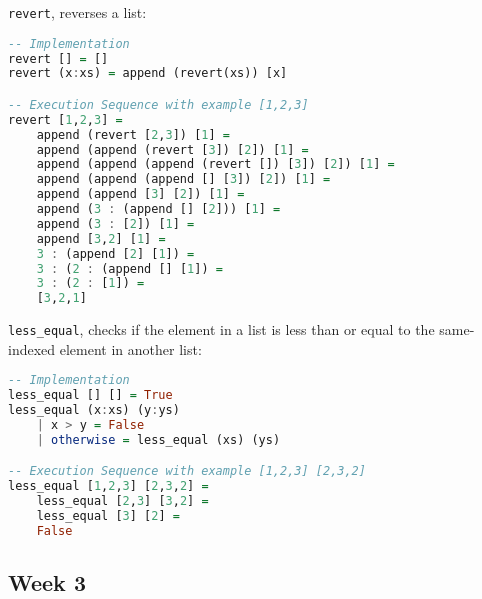 \documentclass{article}
\theoremstyle{theorem}
\theoremstyle{definition}
\theoremstyle{remark}
\begin{document}
\noindent \texttt{revert}, reverses a list:
\begin{lstlisting}[language=Haskell]
-- Implementation
revert [] = []
revert (x:xs) = append (revert(xs)) [x]

-- Execution Sequence with example [1,2,3]
revert [1,2,3] =
    append (revert [2,3]) [1] =
    append (append (revert [3]) [2]) [1] =
    append (append (append (revert []) [3]) [2]) [1] =
    append (append (append [] [3]) [2]) [1] =
    append (append [3] [2]) [1] = 
    append (3 : (append [] [2])) [1] =
    append (3 : [2]) [1] =
    append [3,2] [1] =
    3 : (append [2] [1]) =
    3 : (2 : (append [] [1]) =
    3 : (2 : [1]) =
    [3,2,1]
\end{lstlisting}

\noindent \texttt{less\_equal}, checks if the element in a list is less than or equal to the same-indexed element in another list:
\begin{lstlisting}[language=Haskell]
-- Implementation
less_equal [] [] = True
less_equal (x:xs) (y:ys)
    | x > y = False
    | otherwise = less_equal (xs) (ys)

-- Execution Sequence with example [1,2,3] [2,3,2]
less_equal [1,2,3] [2,3,2] =
    less_equal [2,3] [3,2] = 
    less_equal [3] [2] = 
    False
\end{lstlisting}

\newpage %
\subsection{Week 3}
\end{document}
